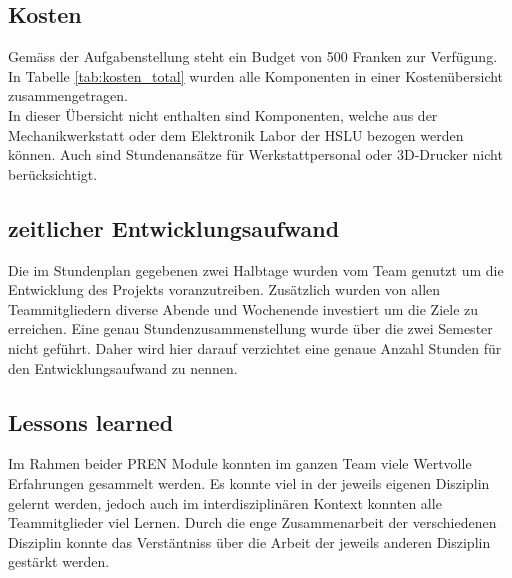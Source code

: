 \documentclass[../../main.tex]{subfiles}
\begin{document}
\begin{comment}
    Schlussdiskussion mit
    - Entwicklungskosten, zeitlicher Entwicklungsaufwand
    - Erfahrungen, „Lessons learned“, kritische Würdigung der Arbeiten
    - offene Punkte, Risiken und Ausblick 
\end{comment}

\subsection{Kosten}
Gemäss der Aufgabenstellung steht ein Budget von 500 Franken zur Verfügung. In Tabelle \ref{tab:kosten_total} wurden alle Komponenten in einer Kostenübersicht zusammengetragen.\\
In dieser Übersicht nicht enthalten sind Komponenten, welche aus der Mechanikwerkstatt oder dem Elektronik Labor der
HSLU bezogen werden können. Auch sind Stundenansätze für Werkstattpersonal oder 3D-Drucker nicht berücksichtigt. \\


\subsection{zeitlicher Entwicklungsaufwand}
Die im Stundenplan gegebenen zwei Halbtage wurden vom Team genutzt um die Entwicklung des Projekts voranzutreiben. Zusätzlich wurden von allen Teammitgliedern diverse Abende und Wochenende investiert um die Ziele zu erreichen. Eine genau Stundenzusammenstellung wurde über die zwei Semester nicht geführt. Daher wird hier darauf verzichtet eine genaue Anzahl Stunden für den Entwicklungsaufwand zu nennen.\\

\subsection{Lessons learned}
Im Rahmen beider PREN Module konnten im ganzen Team viele Wertvolle Erfahrungen gesammelt werden. Es konnte viel in der jeweils eigenen Disziplin gelernt werden, jedoch auch im interdisziplinären Kontext konnten alle Teammitglieder viel Lernen. Durch die enge Zusammenarbeit der verschiedenen Disziplin konnte das Verstäntniss über die Arbeit der jeweils anderen Disziplin gestärkt werden.\\
\end{document}
